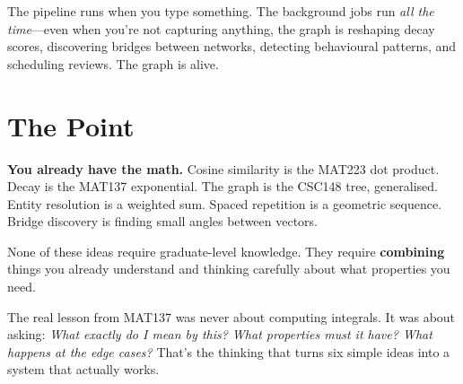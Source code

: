 \documentclass[11pt, letterpaper]{article}
\begin{document}
The pipeline runs when you type something. The background jobs run \emph{all the time}---even when you're not capturing anything, the graph is reshaping decay scores, discovering bridges between networks, detecting behavioural patterns, and scheduling reviews. The graph is alive.

\section{The Point}

\begin{keyidea}
\textbf{You already have the math.} Cosine similarity is the MAT223 dot product. Decay is the MAT137 exponential. The graph is the CSC148 tree, generalised. Entity resolution is a weighted sum. Spaced repetition is a geometric sequence. Bridge discovery is finding small angles between vectors.

None of these ideas require graduate-level knowledge. They require \textbf{combining} things you already understand and thinking carefully about what properties you need.

The real lesson from MAT137 was never about computing integrals. It was about asking: \textit{What exactly do I mean by this? What properties must it have? What happens at the edge cases?} That's the thinking that turns six simple ideas into a system that actually works.
\end{keyidea}
\end{document}
